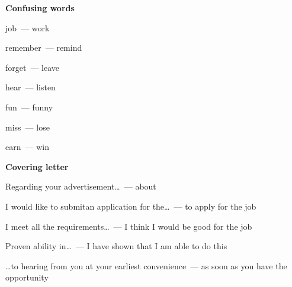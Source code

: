 \documentclass[10pt,a4paper]{article}
\begin{document}
\textbf{Confusing words}

\noindent
job~--- work

\noindent
remember~--- remind

\noindent
forget~--- leave

\noindent
hear~--- listen

\noindent
fun~--- funny

\noindent
miss~--- lose

\noindent
earn~--- win

\par\medskip \noindent \textbf{Covering letter}

\noindent
Regarding your advertisement\dots ~--- about

\noindent
I would like to submitan application for the\dots ~--- to apply for the job

\noindent
I meet all the requirements\dots ~--- I think I would be good for the job

\noindent
Proven ability in\dots ~--- I have shown that I am able to do this

\noindent
\dots to hearing from you at your earliest convenience~--- as soon as you have the opportunity
\end{document}
